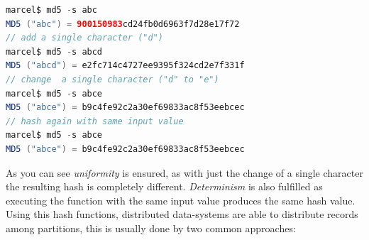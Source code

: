 {\begin{lstlisting}[aboveskip=1ex, belowskip=3ex, xleftmargin=18pt, emphstyle=\underbar, breaklines=true, showstringspaces=false, captionpos=b, caption=Bash Output - \textit{MD5 Hash For Several Input Values}, label=md5_example,language=java]
marcel$ md5 -s abc
MD5 ("abc") = 900150983cd24fb0d6963f7d28e17f72
// add a single character ("d")
marcel$ md5 -s abcd
MD5 ("abcd") = e2fc714c4727ee9395f324cd2e7f331f
// change  a single character ("d" to "e")
marcel$ md5 -s abce
MD5 ("abce") = b9c4fe92c2a30ef69833ac8f53eebcec
// hash again with same input value
marcel$ md5 -s abce
MD5 ("abce") = b9c4fe92c2a30ef69833ac8f53eebcec
\end{lstlisting}

As you can see \textit{uniformity} is ensured, as with just the change of a single character the resulting hash is completely different. \textit{Determinism} is also fulfilled as executing the function with the same input value produces the same hash value.\\
Using this hash functions, distributed data-systems are able to distribute records among partitions, this is usually done by two common approaches:\\

}
